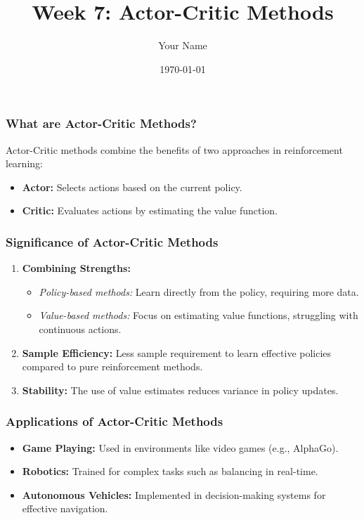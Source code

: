 \documentclass{beamer}
\title{Week 7: Actor-Critic Methods}
\author{Your Name}
\institute{Your Institution}
\date{\today}
\begin{document}
\frame{\titlepage}

\begin{frame}[fragile]
    \titlepage
\end{frame}

\begin{frame}[fragile]
    \frametitle{What are Actor-Critic Methods?}
    
    Actor-Critic methods combine the benefits of two approaches in reinforcement learning:
    
    \begin{itemize}
        \item \textbf{Actor:} Selects actions based on the current policy.
        \item \textbf{Critic:} Evaluates actions by estimating the value function.
    \end{itemize}
\end{frame}

\begin{frame}[fragile]
    \frametitle{Significance of Actor-Critic Methods}
    
    \begin{enumerate}
        \item \textbf{Combining Strengths:} 
        \begin{itemize}
            \item \textit{Policy-based methods:} Learn directly from the policy, requiring more data.
            \item \textit{Value-based methods:} Focus on estimating value functions, struggling with continuous actions.
        \end{itemize}
        
        \item \textbf{Sample Efficiency:} 
        Less sample requirement to learn effective policies compared to pure reinforcement methods.
        
        \item \textbf{Stability:} 
        The use of value estimates reduces variance in policy updates.
    \end{enumerate}
\end{frame}

\begin{frame}[fragile]
    \frametitle{Applications of Actor-Critic Methods}
    
    \begin{itemize}
        \item \textbf{Game Playing:} 
        Used in environments like video games (e.g., AlphaGo).
        
        \item \textbf{Robotics:} 
        Trained for complex tasks such as balancing in real-time.
        
        \item \textbf{Autonomous Vehicles:} 
        Implemented in decision-making systems for effective navigation.
    \end{itemize}
\end{frame}
\end{document}

